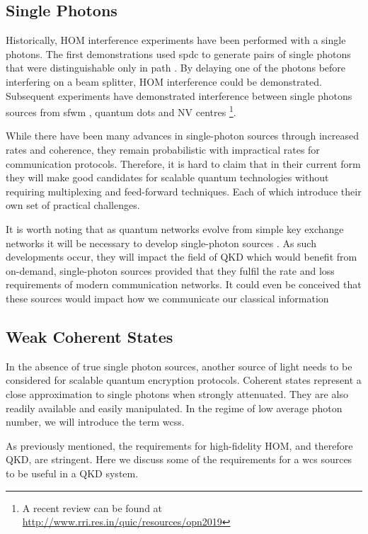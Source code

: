 \subsection{Single Photons}

Historically, \acl{HOM} interference experiments have been performed with a single photons. The first demonstrations used \ac{spdc} to generate pairs of single photons that were distinguishable only in path \cite{}. By delaying one of the photons before interfering on a beam splitter, \ac{HOM} interference could be demonstrated. Subsequent experiments have demonstrated interference between single photons sources from \ac{sfwm} \cite{}, quantum dots \cite{} and NV centres \cite{} \footnote{A recent review can be found at \url{http://www.rri.res.in/quic/resources/opn2019}}.

While there have been many advances in single-photon sources through increased rates and coherence, they remain probabilistic with impractical rates for communication protocols. Therefore, it is hard to claim that in their current form they will make good candidates for scalable quantum technologies without requiring multiplexing and feed-forward techniques. Each of which introduce their own set of practical challenges. 

It is worth noting that as quantum networks evolve from simple key exchange networks it will be necessary to develop single-photon sources \cite{}. As such developments occur, they will impact the field of \ac{QKD} which would benefit from on-demand, single-photon sources provided that they fulfil the rate and loss requirements of modern communication networks. It could even be conceived that these sources would impact how we communicate our classical information \cite{}

\subsection{Weak Coherent States}

In the absence of true single photon sources, another source of light needs to be considered for scalable quantum encryption protocols. Coherent states represent a close approximation to single photons when strongly attenuated. They are also readily available and easily manipulated. In the regime of low average photon number, we will introduce the term \acp{wcs}. 

As previously mentioned, the requirements for high-fidelity \ac{HOM}, and therefore \ac{QKD}, are stringent. Here we discuss some of the requirements for a \ac{wcs} sources to be useful in a \ac{QKD} system. 

